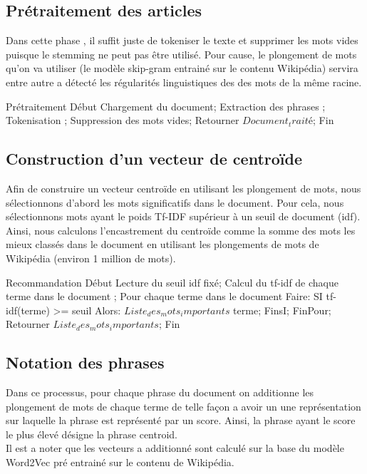 \subsection{Prétraitement des articles}
Dans cette phase , il suffit juste de tokeniser le texte et supprimer les mots vides puisque le stemming ne peut pas être utilisé. Pour cause, le plongement de mots qu'on va utiliser (le modèle skip-gram entrainé sur le contenu Wikipédia) servira entre autre a détecté les régularités linguistiques des des mots de la même racine.

\begin{algorithm}[H]
	\begin{algorithmic}[1]

\STATE Prétraitement
\STATE Début
\STATE Chargement du document;
\STATE Extraction des phrases ;
\STATE Tokenisation ;
\STATE Suppression des mots vides;
\STATE \quad Retourner $Document_traité$;
\STATE Fin

\end{algorithmic}
\end{algorithm}

\subsection{Construction d'un vecteur de centroïde}
Afin de construire un vecteur centroïde en utilisant les plongement de mots, nous sélectionnons d'abord les mots significatifs dans le document. Pour cela, nous sélectionnons mots ayant le poids Tf-IDF supérieur à un seuil de document (idf). Ainsi, nous calculons l'encastrement du centroïde comme la somme des mots les mieux classés dans le document en utilisant les plongements de mots de Wikipédia (environ 1 million de mots). 

\begin{algorithm}[H]
	\begin{algorithmic}[1]
		\STATE Recommandation
		\STATE Début
		\STATE Lecture du seuil idf fixé;
		\STATE Calcul du tf-idf de chaque terme dans le document ;
		\STATE Pour chaque terme dans le document Faire:
		\STATE SI tf-idf(terme) >= seuil Alors:
		\STATE    $Liste_des_mots_importants$ \gets terme;
		\STATE FinsI;
		\STATE FinPour;
		\STATE \quad Retourner $Liste_des_mots_importants$;
		\STATE Fin
	\end{algorithmic}
\end{algorithm}


\subsection{Notation des phrases}
Dans ce processus, pour chaque phrase du document on additionne les plongement de mots de chaque terme de telle façon a avoir un une représentation sur laquelle la phrase est représenté par un score. Ainsi, la phrase ayant le score le plus élevé désigne la phrase centroid.\\
Il est a noter que les vecteurs a additionné sont calculé sur la base du modèle Word2Vec pré entrainé sur le contenu de Wikipédia.

